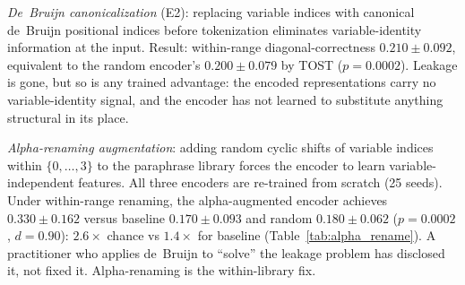 \emph{De~Bruijn canonicalization} (E2): replacing variable indices with canonical de~Bruijn positional indices before tokenization eliminates variable-identity information at the input. Result: within-range diagonal-correctness $0.210 \pm 0.092$, equivalent to the random encoder's $0.200 \pm 0.079$ by TOST ($p{=}0.0002$). Leakage is gone, but so is any trained advantage: the encoded representations carry no variable-identity signal, and the encoder has not learned to substitute anything structural in its place.

\emph{Alpha-renaming augmentation}: adding random cyclic shifts of variable indices within $\{0,\ldots,3\}$ to the paraphrase library forces the encoder to learn variable-independent features. All three encoders are re-trained from scratch (25 seeds). Under within-range renaming, the alpha-augmented encoder achieves $0.330 \pm 0.162$ versus baseline $0.170 \pm 0.093$ and random $0.180 \pm 0.062$ ($p{=}0.0002$, $d{=}0.90$): $2.6\times$ chance vs $1.4\times$ for baseline (Table~\ref{tab:alpha_rename}). A practitioner who applies de~Bruijn to ``solve'' the leakage problem has disclosed it, not fixed it. Alpha-renaming is the within-library fix.

